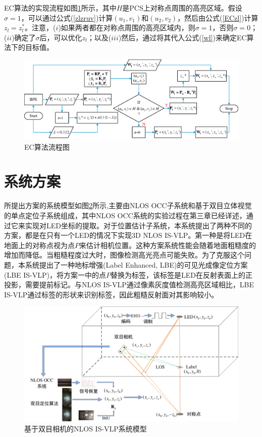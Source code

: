 EC算法的实现流程如图\ref{fig:EC-BPE}所示，其中$H$是PCS上对称点周围的高亮区域。假设$\sigma=1$，可以通过公式(\ref{zlzruv})计算$(u_{1},v_{1})$和$(u_{2},v_{2})$，然后由公式(\ref{ECzl})计算$z_{l}=z_{l}^{*}$。注意，($i $)如果两者都在对称点周围的高亮区域内，则$\sigma=1$，否则$\sigma=0$；($ii $)确定了$\sigma$后，可以优化$z_{l}$；以及($iii $)然后，通过将其代入公式(\ref{wl})来确定EC算法下的目标值。
\begin{figure}[!t]
\centering\includegraphics[width=\textwidth]{FIG/EC procedure.pdf}
\caption{EC算法流程图}
\label{fig:EC-BPE}
\end{figure}





\section{系统方案}

所提出方案的系统模型如图\ref{fig:dualcam_systemscheme}所示,主要由NLOS OCC子系统和基于双目立体视觉的单点定位子系统组成，其中NLOS OCC系统的实验过程在第三章已经详述，通过它来实现对LED坐标的提取。对于位置估计子系统，本系统提出了两种不同的方案，都是在只有一个LED的情况下实现3D NLOS IS-VLP。第一种是将LED在地面上的对称点视为点$P$来估计相机位置。这种方案系统性能会随着地面粗糙度的增加而降低。当粗糙程度过大时，图像检测高光亮点可能失败。为了克服这个问题，本系统提出了一种地标增强(Label Enhanced, LBE)的可见光成像定位方案(LBE IS-VLP)，将方案一中的点$P$替换为标签，该标签是LED在反射表面上的正投影，需要提前标记。与NLOS IS-VLP通过像素灰度值检测高亮区域相比，LBE IS-VLP通过标签的形状来识别标签，因此粗糙反射面对其影响较小。
\begin{figure}[!t]
  \centering
  \includegraphics[width=0.85\linewidth]{FIG/systemscheme.pdf}
 \caption{基于双目相机的NLOS IS-VLP系统模型}
\label{fig:dualcam_systemscheme}
\end{figure}

